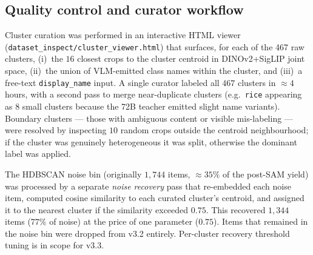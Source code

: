 \subsection{Quality control and curator workflow}
\label{sec:de:curation}

Cluster curation was performed in an interactive HTML viewer
(\texttt{dataset\_inspect/cluster\_viewer.html}) that surfaces, for each
of the 467 raw clusters, (i)~the $16$ closest crops to the cluster
centroid in DINOv2+SigLIP joint space, (ii)~the union of VLM-emitted
class names within the cluster, and (iii)~a free-text \texttt{display\_name}
input. A single curator labeled all $467$ clusters in $\approx 4$
hours, with a second pass to merge near-duplicate clusters (e.g.\
\texttt{rice} appearing as 8 small clusters because the 72B teacher
emitted slight name variants). Boundary clusters --- those with
ambiguous content or visible mis-labeling --- were resolved by inspecting
$10$ random crops outside the centroid neighbourhood; if the cluster
was genuinely heterogeneous it was split, otherwise the dominant label
was applied.

The HDBSCAN noise bin (originally $1{,}744$ items, $\approx 35\%$ of
the post-SAM yield) was processed by a separate \emph{noise recovery}
pass that re-embedded each noise item, computed cosine similarity to
each curated cluster's centroid, and assigned it to the nearest cluster
if the similarity exceeded $0.75$. This recovered $1{,}344$ items
($77\%$ of noise) at the price of one parameter ($0.75$). Items that
remained in the noise bin were dropped from v3.2 entirely. Per-cluster
recovery threshold tuning is in scope for v3.3.
